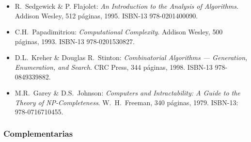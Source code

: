 \begin{itemize}[itemsep=-1pt]
  
\item R.\ {\sc Sedgewick} \& P. {\sc Flajolet}: {\em An                                                                                                          
    Introduction to the Analysis of Algorithms}. Addison Wesley, 512
  p\'{a}ginas, 1995. ISBN-13 978-0201400090.
  
\item C.H.\ {\sc Papadimitriou}: {\em Computational                                                                                                               
     Complexity}. Addison Wesley, 500 p\'{a}ginas, 1993. ISBN-13
   978-0201530827.

 \item D.L.\ {\sc Kreher} \& Douglas R.\ {\sc Stinton}: {\em                                                                                                          
     Combinatorial Algorithms --- Generation, Enumeration, and                                                                                                            
     Search}. CRC Press, 344 p\'{a}ginas, 1998. ISBN-13 978-0849339882.

 \item M.R.\ {\sc Garey} \& D.S.\ {\sc Johnson}: {\em                                                                                                            
     Computers and Intractability: A Guide to the Theory of                                                                                                               
     NP-Completeness}. W.\ H.\ Freeman, 340 p\'{a}ginas, 1979. ISBN-13:
   978-0716710455.   
\end{itemize}

\subsubsection{Complementarias}

